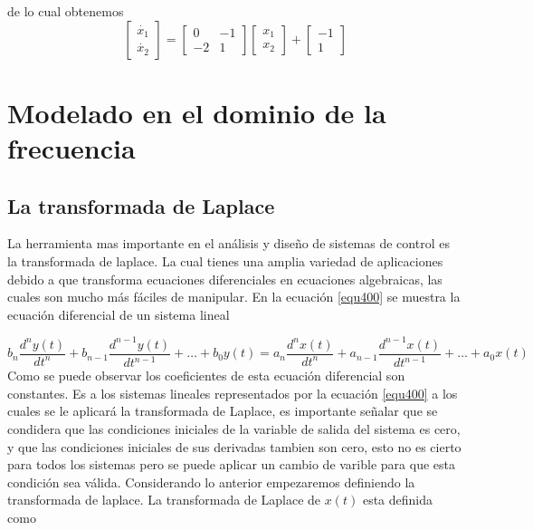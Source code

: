 \documentclass[12pt]{book}
\theoremstyle{definition}
\theoremstyle{remark}
\theoremstyle{plain}
\begin{document}
de lo cual obtenemos
\begin{equation*}
 \begin{bmatrix}
\dot{x_1}\\
\dot{x_2}
\end{bmatrix}=
\begin{bmatrix}
0 & -1\\
-2 & 1
\end{bmatrix}
 \begin{bmatrix}
x_1\\
x_2
\end{bmatrix}
+
 \begin{bmatrix}
-1\\
1
\end{bmatrix}
\end{equation*}
\chapter{Modelado en el dominio de la frecuencia}

\section{La transformada de Laplace}
La herramienta mas importante en el análisis y diseño de sistemas de control es la transformada de laplace. La cual tienes una amplia variedad de aplicaciones debido a que transforma ecuaciones diferenciales en ecuaciones algebraicas, las cuales son mucho más fáciles de manipular. En la ecuación \ref{equ400} se muestra la ecuación diferencial de un sistema lineal

\begin{equation}
\label{equ400}
b_n \frac{d^n y(t)}{dt^n}+b_{n-1} \frac{d^{n-1} y(t)}{dt^{n-1}}+ \dotsc +b_0 y(t)= a_n \frac{d^n x(t)}{dt^n}+a_{n-1} \frac{d^{n-1} x(t)}{dt^{n-1}}+ \dotsc +a_0 x(t)
\end{equation}
Como se puede observar los coeficientes de esta ecuación diferencial son constantes. Es a los sistemas lineales representados por la ecuación \ref{equ400} a los cuales se le aplicará la transformada de Laplace, es importante señalar que se condidera que las condiciones iniciales de la variable de salida del sistema es cero, y que las condiciones iniciales de sus derivadas tambien son cero, esto no es cierto para todos los sistemas pero se puede aplicar un cambio de varible para que esta condición sea válida. Considerando lo anterior empezaremos definiendo la transformada de laplace. La transformada de Laplace de $x(t)$ esta definida como
\end{document}

